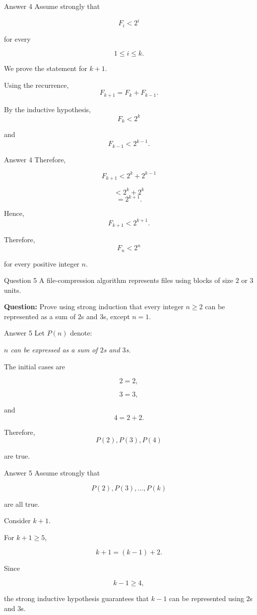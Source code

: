 \begin{frame}{Answer 4}
Assume strongly that

$$
F_i<2^i
$$

for every

$$
1\leq i\leq k.
$$

We prove the statement for $k+1$.

Using the recurrence,
$$
F_{k+1}=F_k+F_{k-1}.
$$

By the inductive hypothesis,
$$
F_k<2^k
$$

and
$$
F_{k-1}<2^{k-1}.
$$

\end{frame}

\begin{frame}{Answer 4}
Therefore,

$$
F_{k+1}
<
2^k+2^{k-1}
$$

$$
<2^k+2^k
$$
$$
=2^{k+1}.
$$

Hence,
$$
F_{k+1}<2^{k+1}.
$$

Therefore,
$$
\boxed{F_n<2^n}
$$

for every positive integer $n$.
\end{frame}


\begin{frame}{Question 5}
A file-compression algorithm represents files using blocks of size $2$ or $3$ units.

\textbf{Question:} Prove using strong induction that every integer $n\geq2$ can be represented as a sum of $2$s and $3$s, except $n=1$.
\end{frame}

\begin{frame}{Answer 5}
Let $P(n)$ denote:

\textit{$n$ can be expressed as a sum of $2$s and $3$s.}

The initial cases are

$$
2=2,
$$

$$
3=3,
$$

and
$$
4=2+2.
$$

Therefore,
$$
P(2),P(3),P(4)
$$

are true.
\end{frame}

\begin{frame}{Answer 5}
Assume strongly that

$$
P(2),P(3),\ldots,P(k)
$$

are all true.

Consider $k+1$.

For $k+1\geq5$,

$$
k+1=(k-1)+2.
$$

Since

$$
k-1\geq4,
$$

the strong inductive hypothesis guarantees that $k-1$ can be represented using $2$s and $3$s.
\end{frame}

